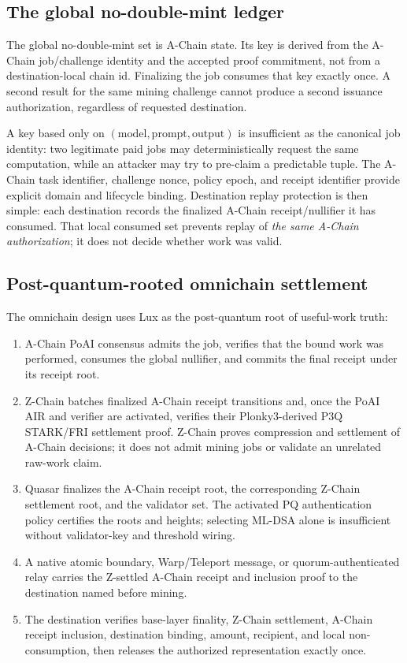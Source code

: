 \documentclass[11pt,a4paper]{article}
\begin{document}
\subsection{The global no-double-mint ledger}\label{sec:registry}

The global no-double-mint set is A-Chain state. Its key is derived from the A-Chain job/challenge identity and the accepted proof commitment, not from a destination-local chain id. Finalizing the job consumes that key exactly once. A second result for the same mining challenge cannot produce a second issuance authorization, regardless of requested destination.

A key based only on $(\text{model},\text{prompt},\text{output})$ is insufficient as the canonical job identity: two legitimate paid jobs may deterministically request the same computation, while an attacker may try to pre-claim a predictable tuple. The A-Chain task identifier, challenge nonce, policy epoch, and receipt identifier provide explicit domain and lifecycle binding. Destination replay protection is then simple: each destination records the finalized A-Chain receipt/nullifier it has consumed. That local consumed set prevents replay of \emph{the same A-Chain authorization}; it does not decide whether work was valid.

\subsection{Post-quantum-rooted omnichain settlement}\label{sec:oracle}

The omnichain design uses Lux as the post-quantum root of useful-work truth:
\begin{enumerate}
  \item A-Chain PoAI consensus admits the job, verifies that the bound work was performed, consumes the global nullifier, and commits the final receipt under its receipt root.
  \item Z-Chain batches finalized A-Chain receipt transitions and, once the PoAI AIR and verifier are activated, verifies their Plonky3-derived P3Q STARK/FRI settlement proof. Z-Chain proves compression and settlement of A-Chain decisions; it does not admit mining jobs or validate an unrelated raw-work claim.
  \item Quasar finalizes the A-Chain receipt root, the corresponding Z-Chain settlement root, and the validator set. The activated PQ authentication policy certifies the roots and heights; selecting ML-DSA alone is insufficient without validator-key and threshold wiring.
  \item A native atomic boundary, Warp/Teleport message, or quorum-authenticated relay carries the Z-settled A-Chain receipt and inclusion proof to the destination named before mining.
  \item The destination verifies base-layer finality, Z-Chain settlement, A-Chain receipt inclusion, destination binding, amount, recipient, and local non-consumption, then releases the authorized representation exactly once.
\end{enumerate}
\end{document}
